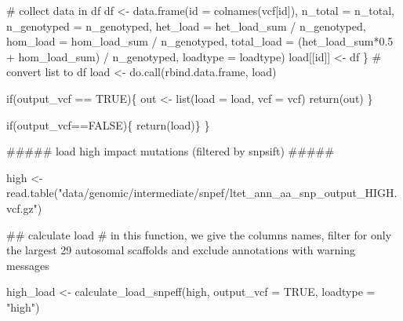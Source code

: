 \documentclass[
  letterpaper,
  DIV=11,
  numbers=noendperiod]{scrreprt}
\newenvironment{Shaded}{}{}
\newcommand{\AttributeTok}[1]{\textcolor[rgb]{0.84,0.23,0.29}{#1}}
\newcommand{\CommentTok}[1]{\textcolor[rgb]{0.42,0.45,0.49}{#1}}
\newcommand{\ConstantTok}[1]{\textcolor[rgb]{0.00,0.36,0.77}{#1}}
\newcommand{\ControlFlowTok}[1]{\textcolor[rgb]{0.84,0.23,0.29}{#1}}
\newcommand{\DocumentationTok}[1]{\textcolor[rgb]{0.42,0.45,0.49}{#1}}
\newcommand{\FloatTok}[1]{\textcolor[rgb]{0.00,0.36,0.77}{#1}}
\newcommand{\FunctionTok}[1]{\textcolor[rgb]{0.44,0.26,0.76}{#1}}
\newcommand{\NormalTok}[1]{\textcolor[rgb]{0.14,0.16,0.18}{#1}}
\newcommand{\OtherTok}[1]{\textcolor[rgb]{0.44,0.26,0.76}{#1}}
\newcommand{\SpecialCharTok}[1]{\textcolor[rgb]{0.00,0.36,0.77}{#1}}
\newcommand{\StringTok}[1]{\textcolor[rgb]{0.01,0.18,0.38}{#1}}
\begin{document}
\begin{Shaded}
\begin{Highlighting}[]
    \CommentTok{\# collect data in df}
\NormalTok{    df }\OtherTok{\textless{}{-}} \FunctionTok{data.frame}\NormalTok{(}\AttributeTok{id =} \FunctionTok{colnames}\NormalTok{(vcf[id]),}
                     \AttributeTok{n\_total =}\NormalTok{ n\_total,}
                     \AttributeTok{n\_genotyped =}\NormalTok{ n\_genotyped,}
                     \AttributeTok{het\_load =}\NormalTok{ het\_load\_sum }\SpecialCharTok{/}\NormalTok{ n\_genotyped,}
                     \AttributeTok{hom\_load =}\NormalTok{ hom\_load\_sum }\SpecialCharTok{/}\NormalTok{ n\_genotyped,}
                     \AttributeTok{total\_load =}\NormalTok{ (het\_load\_sum}\SpecialCharTok{*}\FloatTok{0.5} \SpecialCharTok{+}\NormalTok{ hom\_load\_sum) }\SpecialCharTok{/}\NormalTok{ n\_genotyped,}
                     \AttributeTok{loadtype =}\NormalTok{ loadtype)}
\NormalTok{    load[[id]] }\OtherTok{\textless{}{-}}\NormalTok{ df}
\NormalTok{  \}}
  \CommentTok{\# convert list to df}
\NormalTok{  load }\OtherTok{\textless{}{-}} \FunctionTok{do.call}\NormalTok{(rbind.data.frame, load)}
  
  \ControlFlowTok{if}\NormalTok{(output\_vcf }\SpecialCharTok{==} \ConstantTok{TRUE}\NormalTok{)\{}
\NormalTok{    out }\OtherTok{\textless{}{-}} \FunctionTok{list}\NormalTok{(}\AttributeTok{load =}\NormalTok{ load, }\AttributeTok{vcf =}\NormalTok{ vcf)}
    \FunctionTok{return}\NormalTok{(out)}
\NormalTok{  \}}
  
  \ControlFlowTok{if}\NormalTok{(output\_vcf}\SpecialCharTok{==}\ConstantTok{FALSE}\NormalTok{)\{}
    \FunctionTok{return}\NormalTok{(load)\}}
\NormalTok{\}}

\DocumentationTok{\#\#\#\#\# load high impact mutations (filtered by snpsift) \#\#\#\#\#}

\NormalTok{high }\OtherTok{\textless{}{-}} \FunctionTok{read.table}\NormalTok{(}\StringTok{"data/genomic/intermediate/snpef/ltet\_ann\_aa\_snp\_output\_HIGH.vcf.gz"}\NormalTok{)}

\DocumentationTok{\#\# calculate load }
\CommentTok{\# in this function, we give the columns names, filter for only the largest 29 autosomal scaffolds and exclude annotations with warning messages}

\NormalTok{high\_load }\OtherTok{\textless{}{-}} \FunctionTok{calculate\_load\_snpeff}\NormalTok{(high, }\AttributeTok{output\_vcf =} \ConstantTok{TRUE}\NormalTok{, }\AttributeTok{loadtype =} \StringTok{"high"}\NormalTok{)}
\end{Highlighting}
\end{Shaded}
\end{document}
